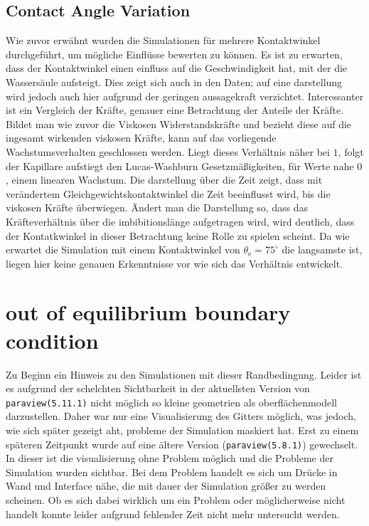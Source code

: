 \subsection{Contact Angle Variation}
Wie zuvor erwähnt wurden die Simulationen für mehrere Kontaktwinkel durchgeführt, um mögliche Einflüsse bewerten zu können. Es ist zu erwarten, dass der Kontaktwinkel einen einfluss auf die Geschwindigkeit hat, mit der die Wassersäule aufsteigt. Dies zeigt sich auch in den Daten; auf eine darstellung wird jedoch auch hier aufgrund der geringen aussagekraft verzichtet. Interessanter ist ein Vergleich der Kräfte, genauer eine Betrachtung der Anteile der Kräfte. Bildet man wie zuvor die Viskosen Widerstandskräfte und bezieht diese auf die ingesamt wirkenden viskosen Kräfte, kann auf das vorliegende Wachstumsverhalten geschlossen werden. Liegt dieses Verhältnis näher bei $1$, folgt der Kapillare aufstiegt den Lucas-Washburn Gesetzmäßigkeiten, für Werte nahe $0$, einem linearen Wachstum. Die darstellung über die Zeit zeigt, dass mit verändertem Gleichgewichtskontaktwinkel die Zeit beeinflusst wird, bis die viskosen Kräfte überwiegen. Ändert man die Darstellung so, dass das Kräfteverhältnis über die imbibitionslänge aufgetragen wird, wird deutlich, dass der Kontatkwinkel in dieser Betrachtung keine Rolle zu spielen scheint. Da wie erwartet die Simulation mit einem Kontaktwinkel von $\theta_{\mathrm{e}}=75^{\circ}$ die langsamste ist, liegen hier keine genauen Erkenntnisse vor wie sich das Verhältnis entwickelt. 





\section{out of equilibrium boundary condition}
\label{sec: outOfEquilibriumBoundaryCondition}
Zu Beginn ein Hinweis zu den Simulationen mit dieser Randbedingung. Leider ist es aufgrund der schelchten Sichtbarkeit in der aktuellsten Version von \texttt{paraview(5.11.1)} nicht möglich so kleine geometrien als oberflächenmodell darzustellen. Daher war nur eine Visualisierung des Gitters möglich, was jedoch, wie sich später gezeigt aht, probleme der Simulation maskiert hat. Erst zu einem späteren Zeitpunkt wurde auf eine ältere Version (\texttt{paraview(5.8.1)}) gewechselt. In dieser ist die visualisierung ohne Problem möglich und die Probleme der Simulation wurden sichtbar. Bei dem Problem handelt es sich um Drücke in Wand und Interface nähe, die mit dauer der Simulation größer zu werden scheinen. Ob es sich dabei wirklich um ein Problem oder möglicherweise nicht handelt konnte leider aufgrund fehlender Zeit nicht mehr untersucht werden. 

